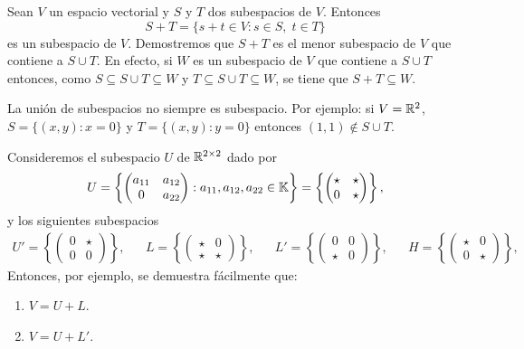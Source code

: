 \begin{block}
	Sean $V$ un espacio vectorial y $S$ y $T$ dos subespacios de $V$.  Entonces 
    \[
        S+T=\{s+t\in V: s\in S,\;t\in T\}
    \]
	es un subespacio de $V$.  Demostremos que $S+T$ es el menor subespacio de
	$V$ que contiene a $S\cup T$. En efecto, si $W$ es un subespacio de $V$ que
	contiene a $S\cup T$ entonces, como $S\subseteq S\cup T\subseteq W$ y
	$T\subseteq S\cup T\subseteq W$, se tiene que $S+T\subseteq W$. 
\end{block}

\begin{remark}
    La unión de subespacios no siempre es subespacio. Por ejemplo: si $V=\mathbb{R}^2$,
    $S=\{(x,y):x=0\}$ y $T=\{(x,y):y=0\}$ entonces $(1,1)\not\in S\cup T$.
\end{remark}

\begin{example}
	\label{exa:R2x2}
	Consideremos el subespacio $U$ de $\mathbb{R}^{2\times 2}$ dado por 
	\[
	U=\left\{\begin{pmatrix}
		a_{11} & a_{12}\\
		0 & a_{22}
	\end{pmatrix}
	:a_{11},a_{12},a_{22}\in\mathbb{K}\right\}
	= \left\{\begin{pmatrix}
			\star & \star\\
			0 & \star
		\end{pmatrix}
		\right\},
	\]
	y los siguientes subespacios
	\begin{align*}
		U' = \left\{\begin{pmatrix}
			0 & \star\\
			0 & 0
		\end{pmatrix}
		\right\},
		&&
		L = \left\{\begin{pmatrix}
			\star & 0\\
			\star & \star
		\end{pmatrix}
		\right\},
		&&
		L' = \left\{\begin{pmatrix}
			0 & 0\\
			\star & 0
		\end{pmatrix}
		\right\},
		&&
		H = \left\{\begin{pmatrix}
			\star & 0\\
			0 & \star
		\end{pmatrix}
		\right\},
	\end{align*}
	Entonces, por ejemplo, se demuestra fácilmente que:
	\begin{enumerate}
		\item $V=U+L$.
		\item $V=U+L'$.
	\end{enumerate}
\end{example}

